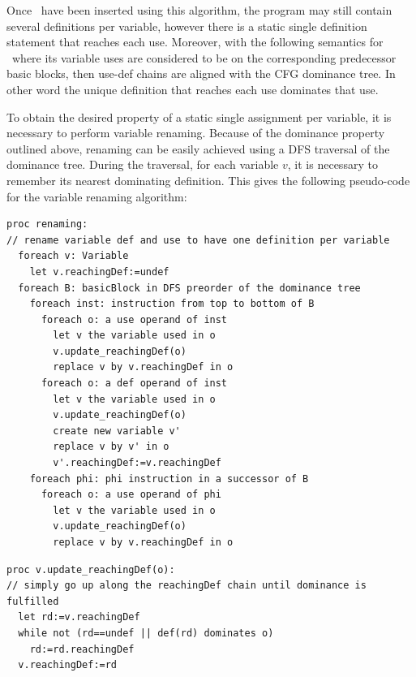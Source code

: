 Once \phiops\ have been inserted using this algorithm, the program may still contain several definitions per variable, however there is a static single definition statement that reaches each use. Moreover, with the following semantics for \phiops\ where its variable uses are considered to be on the corresponding predecessor basic blocks, then use-def chains are aligned with the CFG dominance tree. In other word the unique definition that reaches each use dominates that use.

To obtain the desired property of a static single assignment per variable,
it is necessary to perform variable renaming.
Because of the dominance property outlined above,
renaming can be easily achieved using a DFS traversal of the dominance tree.
During the traversal, for each variable $v$, it is necessary to remember its nearest dominating definition.
This gives the following pseudo-code for the variable renaming algorithm:
\begin{verbatim}
proc renaming:
// rename variable def and use to have one definition per variable
  foreach v: Variable
    let v.reachingDef:=undef
  foreach B: basicBlock in DFS preorder of the dominance tree
    foreach inst: instruction from top to bottom of B
      foreach o: a use operand of inst
        let v the variable used in o
        v.update_reachingDef(o)
        replace v by v.reachingDef in o
      foreach o: a def operand of inst
        let v the variable used in o
        v.update_reachingDef(o)
        create new variable v'
        replace v by v' in o
        v'.reachingDef:=v.reachingDef
    foreach phi: phi instruction in a successor of B
      foreach o: a use operand of phi
        let v the variable used in o
        v.update_reachingDef(o)
        replace v by v.reachingDef in o
\end{verbatim}

\begin{verbatim}
proc v.update_reachingDef(o):
// simply go up along the reachingDef chain until dominance is fulfilled 
  let rd:=v.reachingDef
  while not (rd==undef || def(rd) dominates o)
    rd:=rd.reachingDef
  v.reachingDef:=rd
\end{verbatim}

